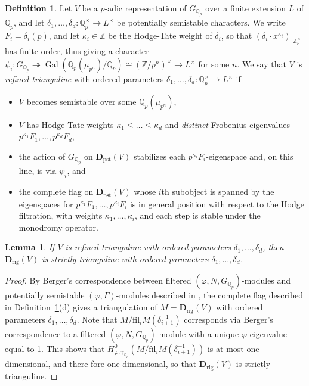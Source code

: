 \documentclass[12pt]{article}
\newtheorem{lemma}[theorem]{Lemma}
\theoremstyle{definition}
\newtheorem{defn}[theorem]{Definition}
\numberwithin{equation}{theorem}
\newcommand{\QQ}{\mathbb{Q}}
\newcommand{\ZZ}{\mathbb{Z}}
\newcommand{\bbD}{\mathbf{D}}
\newcommand{\fil}{\mathrm{fil}}
\newcommand{\pst}{\mathrm{pst}}
\def\Qp{\QQ_p}
\newcommand{\rig}{\mathrm{rig}}
\newcommand{\Zp}{\ZZ_p}
\DeclareMathOperator{\Gal}{Gal}
\begin{document}
\begin{defn}
\label{D:refined representation}
Let $V$ be a $p$-adic representation of $G_{\Qp}$ over a finite extension $L$ of $\Qp$, and let $\delta_1, \ldots, \delta_d: \Qp^\times \to L^\times$ be potentially semistable characters.  We write $F_i = \delta_i(p)$, and let $\kappa_i \in \ZZ$ be the Hodge-Tate weight of $\delta_i$, so that $(\delta_i \cdot x^{\kappa_i})|_{\Zp^\times}$ has finite order, thus giving a character $\psi_i: G_{\Qp} \twoheadrightarrow \Gal(\Qp(\mu_{p^n})/\Qp) \cong (\ZZ/p^n)^\times \to L^\times$ for some $n.$  We say that $V$ is \emph{refined trianguline} with ordered parameters $\delta_1, \dots, \delta_d: \Qp^\times \to L^\times$ if
\begin{itemize}
\item[(a)] $V$ becomes semistable over some $\Qp(\mu_{p^n})$,
\item[(b)] $V$ has Hodge-Tate weights $\kappa_1 \leq \dots \leq \kappa_d$ and \emph{distinct} Frobenius eigenvalues $p^{\kappa_1}F_1, \dots, p^{\kappa_d}F_d$,
\item[(c)] the action of $G_{\Qp}$ on $\bbD_\pst(V)$ stabilizes each $p^{\kappa_i}F_i$-eigenspace and, on this line, is via $\psi_i$, and
\item[(d)] the complete flag on $\bbD_\pst(V)$ whose $i$th subobject
  is spanned by the eigenspaces for
  $p^{\kappa_1}F_1,\ldots,p^{\kappa_i}F_i$ is in general position with
  respect to the Hodge filtration, with weights
  $\kappa_1,\ldots,\kappa_i$, and each step is stable under the
  monodromy operator.
\end{itemize}
\end{defn}


\begin{lemma}
\label{L:refined family is strict trianguline}
If $V$ is refined trianguline with ordered parameters $\delta_1, \dots, \delta_d$, then $\bbD_\rig(V)$ is strictly trianguline with ordered parameters $\delta_1, \dots, \delta_d$.
\end{lemma}
\begin{proof}
By Berger's correspondence between filtered $(\varphi, N, G_{\Qp})$-modules and potentially semistable $(\varphi, \Gamma)$-modules described in \cite[Th\'eor\`eme~A]{berger-dictionary}, the complete flag described in Definition~\ref{D:refined representation}(d) gives a triangulation of $M = \bbD_\rig(V)$ with ordered parameters $\delta_1, \dots, \delta_d$.  Note that $M/\fil_iM(\delta_{i+1}^{-1})$ corresponds via Berger's correspondence to a filtered $(\varphi, N, G_{\Qp})$-module with a unique $\varphi$-eigenvalue equal to 1.  This shows that $H^0_{\varphi, \gamma_{\Qp}}(M/\fil_iM(\delta_{i+1}^{-1}))$ is at most one-dimensional, and there fore one-dimensional, so that $\bbD_\rig(V)$ is strictly trianguline.
\end{proof}
\end{document}
